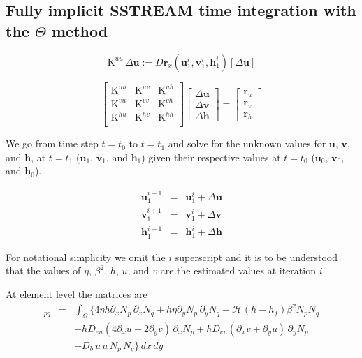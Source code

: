 \documentclass[10pt,a4paper]{book}
\newcommand{\He}{\mathcal{H}}
\newcommand{\p}{\partial}
\begin{document}
\subsection{Fully implicit SSTREAM time integration with the $\Theta$ method}


\[
\mathrm{K}^{uu}\, \Delta \bm{u} :=D \bm{r}_x(\bm{u}_1^{i},\bm{v}_1^i,\bm{h}_1^i)[\Delta \bm{u}]
\]


\begin{equation}
\left [ \begin{array}{ccc}
      \mathrm{K}^{uu} &  \mathrm{K}^{uv} & \mathrm{K}^{uh} \\
      \mathrm{K}^{vu} &  \mathrm{K}^{vv} & \mathrm{K}^{vh} \\
      \mathrm{K}^{hu} &  \mathrm{K}^{hv} & \mathrm{K}^{hh} \\
\end{array} \right ]
\left [ \begin{array}{c}
       \Delta \bm{u} \\
       \Delta \bm{v} \\
       \Delta \bm{h} 
\end{array} \right ]
=\left [ \begin{array}{c} 
\bm{r}_u \\ 
\bm{r}_v  \\
\bm{r}_h 
\end{array} 
\right ]
\end{equation}


We go from time step $t=t_0$ to $t=t_1$ and solve for the unknown values for $\bm{u}$,
$\bm{v}$, and $\bm{h}$, at $t=t_1$ ($\bm{u}_1$, $\bm{v}_1$, and $\bm{h}_1$)
given their respective values at $t=t_0$ ($\bm{u}_0$, $\bm{v}_0$, and $\bm{h}_0$).

\begin{eqnarray*}
\bm{u}_1^{i+1}&=& \bm{u}_1^{i}+ \Delta \bm{u} \\
\bm{v}_1^{i+1}&=& \bm{v}_1^{i}+ \Delta \bm{v} \\
\bm{h}_1^{i+1}&=& \bm{h}_1^{i}+ \Delta \bm{h} 
\end{eqnarray*}



For notational simplicity we omit the $i$ superscript and it is to be understood that the values of
$\eta$, $\beta^2$, $h$, $u$, and $v$ are the estimated values at iteration $i$.

At element level the matrices are
\begin{eqnarray*}
[\mathrm{K}^{uu}]_{pq} 
&=&\int_{\Omega} \big \{
4 \eta h \p_x N_p \,\p_x N_q  + h \eta \p_y N_p \, \p_y N_q 
+ \He(h-h_f) \beta^2 N_p N_q \\
& & + h D_{eu} (4 \p_x u + 2 \p_y v) \, \p_x N_p+ h D_{eu} (\p_x v + \p_y u) \, \p_y N_p \\
& & + D_b\, u \, u \,N_p \, N_q \big \} \, dx \, dy
\end{eqnarray*}
\end{document}
